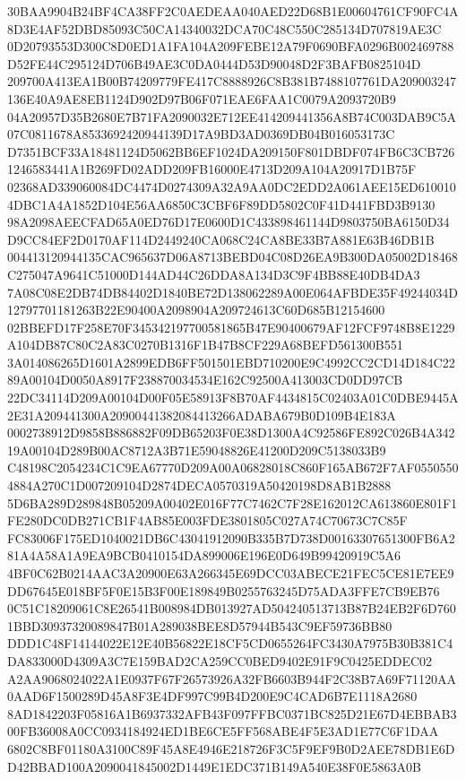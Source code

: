 \documentclass[UTF8,fontset=fandol,zihao=-4,a4paper]{ctexart}
\begin{document}
{{30BAA9904B24BF4CA38FF2C0AEDEAA040AED22D68B1E00604761CF90FC4A8D3E4AF52DBD85093C50CA14340032DCA70C48C550C285134D707819AE3C
0D20793553D300C8D0ED1A1FA104A209FEBE12A79F0690BFA0296B002469788D52FE44C295124D706B49AE3C0DA0444D53D90048D2F3BAFB0825104D
209700A413EA1B00B74209779FE417C8888926C8B381B7488107761DA209003247136E40A9AE8EB1124D902D97B06F071EAE6FAA1C0079A2093720B9
04A20957D35B2680E7B71FA2090032E712EE414209441356A8B74C003DAB9C5A07C0811678A8533692420944139D17A9BD3AD0369DB04B016053173C
D7351BCF33A18481124D5062BB6EF1024DA209150F801DBDF074FB6C3CB7261246583441A1B269FD02ADD209FB16000E4713D209A104A20917D1B75F
02368AD339060084DC4474D0274309A32A9AA0DC2EDD2A061AEE15ED6100104DBC1A4A1852D104E56AA6850C3CBF6F89DD5802C0F41D441FBD3B9130
98A2098AEECFAD65A0ED76D17E0600D1C433898461144D9803750BA6150D34D9CC84EF2D0170AF114D2449240CA068C24CA8BE33B7A881E63B46DB1B
004413120944135CAC965637D06A8713BEBD04C08D26EA9B300DA05002D18468C275047A9641C51000D144AD44C26DDA8A134D3C9F4BB88E40DB4DA3
7A08C08E2DB74DB84402D1840BE72D138062289A00E064AFBDE35F49244034D12797701181263B22E90400A2098904A209724613C60D685B12154600
02BBEFD17F258E70F345342197700581865B47E90400679AF12FCF9748B8E1229A104DB87C80C2A83C0270B1316F1B47B8CF229A68BEFD561300B551
3A014086265D1601A2899EDB6FF501501EBD710200E9C4992CC2CD14D184C2289A00104D0050A8917F238870034534E162C92500A413003CD0DD97CB
22DC34114D209A00104D00F05E58913F8B70AF4434815C02403A01C0DBE9445A2E31A209441300A20900441382084413266ADABA679B0D109B4E183A
0002738912D9858B886882F09DB65203F0E38D1300A4C92586FE892C026B4A34219A00104D289B00AC8712A3B71E59048826E41200D209C5138033B9
C48198C2054234C1C9EA67770D209A00A06828018C860F165AB672F7AF05505504884A270C1D007209104D2874DECA0570319A50420198D8AB1B2888
5D6BA289D289848B05209A00402E016F77C7462C7F28E162012CA613860E801F1FE280DC0DB271CB1F4AB85E003FDE3801805C027A74C70673C7C85F
FC83006F175ED1040021DB6C43041912090B335B7D738D00163307651300FB6A281A4A58A1A9EA9BCB0410154DA899006E196E0D649B99420919C5A6
4BF0C62B0214AAC3A20900E63A266345E69DCC03ABECE21FEC5CE81E7EE9DD67645E018BF5F0E15B3F00E189849B0255763245D75ADA3FFE7CB9EB76
0C51C18209061C8E26541B008984DB013927AD504240513713B87B24EB2F6D7601BBD30937320089847B01A289038BEE8D57944B543C9EF59736BB80
DDD1C48F14144022E12E40B56822E18CF5CD0655264FC3430A7975B30B381C4DA833000D4309A3C7E159BAD2CA259CC0BED9402E91F9C0425EDDEC02
A2AA9068024022A1E0937F67F26573926A32FB6603B944F2C38B7A69F71120AA0AAD6F1500289D45A8F3E4DF997C99B4D200E9C4CAD6B7E1118A2680
8AD1842203F05816A1B6937332AFB43F097FFBC0371BC825D21E67D4EBBAB300FB36008A0CC0934184924ED1BE6CE5FF568ABE4F5E3AD1E77C6F1DAA
6802C8BF01180A3100C89F45A8E4946E218726F3C5F9EF9B0D2AEE78DB1E6DD42BBAD100A2090041845002D1449E1EDC371B149A540E38F0E5863A0B
}}
\end{document}
